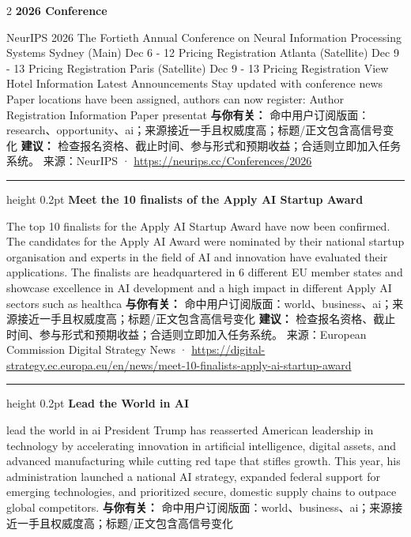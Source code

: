 \documentclass[10.5pt]{ctexart}
\begin{document}
\begin{multicols}{2}
{\large\bfseries 2026 Conference}\par
NeurIPS 2026 The Fortieth Annual Conference on Neural Information Processing Systems Sydney (Main) Dec 6 - 12 Pricing Registration Atlanta (Satellite) Dec 9 - 13 Pricing Registration Paris (Satellite) Dec 9 - 13 Pricing Registration View Hotel Information Latest Announcements Stay updated with conference news Paper locations have been assigned, authors can now register: Author Registration Information Paper presentat
\textbf{与你有关：} 命中用户订阅版面：research、opportunity、ai；来源接近一手且权威度高；标题/正文包含高信号变化
\textbf{建议：} 检查报名资格、截止时间、参与形式和预期收益；合适则立即加入任务系统。
{\footnotesize\color{ormuted} 来源：NeurIPS · \url{https://neurips.cc/Conferences/2026}}
\vspace{2mm}
\hrule height 0.2pt
\vspace{2mm}
{\large\bfseries Meet the 10 finalists of the Apply AI Startup Award}\par
The top 10 finalists for the Apply AI Startup Award have now been confirmed. The candidates for the Apply AI Award were nominated by their national startup organisation and experts in the field of AI and innovation have evaluated their applications. The finalists are headquartered in 6 different EU member states and showcase excellence in AI development and a high impact in different Apply AI sectors such as healthca
\textbf{与你有关：} 命中用户订阅版面：world、business、ai；来源接近一手且权威度高；标题/正文包含高信号变化
\textbf{建议：} 检查报名资格、截止时间、参与形式和预期收益；合适则立即加入任务系统。
{\footnotesize\color{ormuted} 来源：European Commission Digital Strategy News · \url{https://digital-strategy.ec.europa.eu/en/news/meet-10-finalists-apply-ai-startup-award}}
\vspace{2mm}
\hrule height 0.2pt
\vspace{2mm}
{\large\bfseries Lead the World in AI}\par
lead the world in ai President Trump has reasserted American leadership in technology by accelerating innovation in artificial intelligence, digital assets, and advanced manufacturing while cutting red tape that stifles growth. This year, his administration launched a national AI strategy, expanded federal support for emerging technologies, and prioritized secure, domestic supply chains to outpace global competitors.
\textbf{与你有关：} 命中用户订阅版面：world、business、ai；来源接近一手且权威度高；标题/正文包含高信号变化

\end{multicols}
\end{document}
